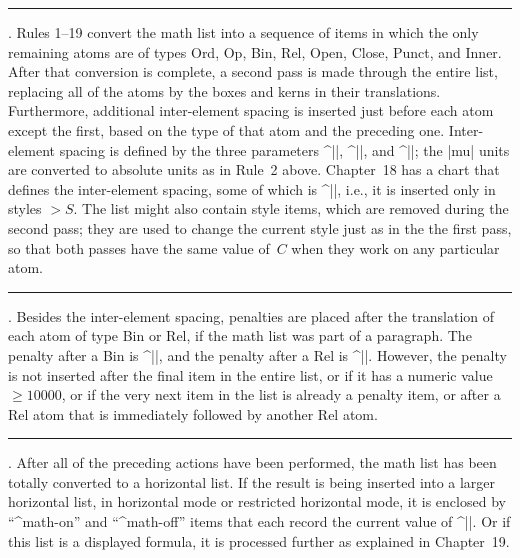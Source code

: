 \medbreak \rule 20. Rules 1--19 convert the math list into a sequence of
items in which the only remaining atoms are of types Ord, Op, Bin, Rel,
Open, Close, Punct, and Inner. After that conversion is complete, a second pass
is made through the entire list, replacing all of the atoms by the boxes
and kerns in their translations. Furthermore, additional inter-element
spacing is inserted just before each atom except the first, based on the
type of that atom and the preceding one.  Inter-element spacing is defined
by the three parameters ^|\thinmuskip|, ^|\medmuskip|, and
^|\thickmuskip|; the |mu| units are converted to absolute units as in
Rule~2 above.  Chapter~18 has a chart that defines the inter-element
spacing, some of which is ^|\nonscript|, i.e., it is inserted only in
styles $>S$.  The list might also contain style items, which are removed
during the second pass; they are used to change the current style just as
in the the first pass, so that both passes have the same value of~$C$ when
they work on any particular atom.

\rule 21. Besides the inter-element spacing, penalties are placed after
the translation of each atom of type Bin or Rel, if the math list was part
of a paragraph.  The penalty after a Bin is ^|\binoppenalty|, and the
penalty after a Rel is ^|\relpenalty|. However, the penalty is not
inserted after the final item in the entire list, or if it has a numeric
value~$\ge10000$, or if the very next item in the list is already a
penalty item, or after a Rel atom that is immediately followed by another
Rel atom.

\rule 22. After all of the preceding actions have been performed, the math
list has been totally converted to a horizontal list. If the result is
being inserted into a larger horizontal list, in horizontal mode or
restricted horizontal mode, it is enclosed by ``^{math-on}'' and
``^{math-off}'' items that each record the current value of\/
^|\mathsurround|.  Or if this list is a displayed formula, it
is processed further as explained in Chapter~19.

